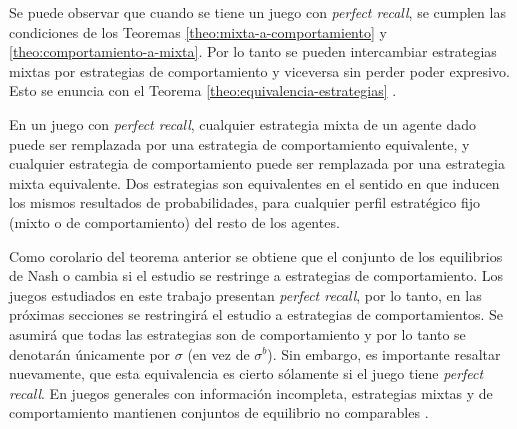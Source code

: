 Se puede observar que cuando se tiene un juego con \textit{perfect recall}, se cumplen las condiciones de los Teoremas \ref{theo:mixta-a-comportamiento} y \ref{theo:comportamiento-a-mixta}. Por lo tanto se pueden intercambiar estrategias mixtas por estrategias de comportamiento y viceversa sin perder poder expresivo. Esto se enuncia con el Teorema \ref{theo:equivalencia-estrategias} \cite[p.~45]{bib:handbook-blai}.

\begin{theorem}
\label{theo:equivalencia-estrategias}
En un juego con \textit{perfect recall}, cualquier estrategia mixta de un agente dado puede ser remplazada por una estrategia de comportamiento equivalente, y cualquier estrategia de comportamiento puede ser remplazada por una estrategia mixta equivalente. Dos estrategias son equivalentes en el sentido en que inducen los mismos resultados de probabilidades, para cualquier perfil estratégico fijo (mixto o de comportamiento) del resto de los agentes.
\end{theorem}

Como corolario del teorema anterior se obtiene que el conjunto de los equilibrios de Nash o cambia si el estudio se restringe a estrategias de comportamiento. Los juegos estudiados en este trabajo presentan \textit{perfect recall}, por lo tanto, en las próximas secciones se restringirá el estudio a estrategias de comportamientos. Se asumirá que todas las estrategias son de comportamiento y por lo tanto se denotarán únicamente por $\sigma$ (en vez de $\sigma^b$). Sin embargo, es importante resaltar nuevamente, que esta equivalencia es cierto sólamente si el juego tiene \textit{perfect recall}. En juegos generales con información incompleta, estrategias mixtas y de comportamiento mantienen conjuntos de equilibrio no comparables \cite[p.~45]{bib:handbook-blai}.

